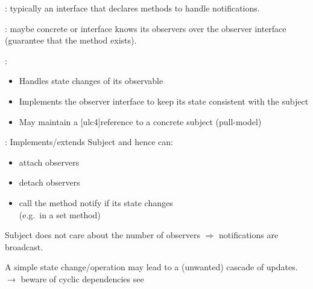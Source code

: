 \begin{partbox}[Participants]\nospacing
  \begin{itemizenosep}
      \item {}: typically an interface that declares methods to
      handle notifications.
      \item {}: maybe concrete or interface knows its observers over
      the observer interface (guarantee that the method \ul{}
      exists).
        \item {}:
      \begin{itemize}
          \item Handles state changes of its observable
          \item Implements the observer interface to keep its state consistent with
                the subject
          \item May maintain a \ul[ulc4]{reference} to a concrete subject (pull-model)
      \end{itemize}
      \item {}: Implements/extends Subject and hence can:
      \begin{itemize}
          \item attach observers
          \item detach observers
          \item call the method notify if its state changes\\
          (e.g.\ in a set method)
      \end{itemize}
  \end{itemizenosep}
\end{partbox}
\begin{consequencebox}[Consequence]
  \begin{itemizenosep}
    \item Subject does not care about the number of observers $\Rightarrow$
    notifications are broadcast.
    \item A simple state change/operation may lead to a (unwanted) cascade of
  updates.\\
  $\rightarrow$ beware of cyclic dependencies see
  \end{itemizenosep}
\end{consequencebox}
